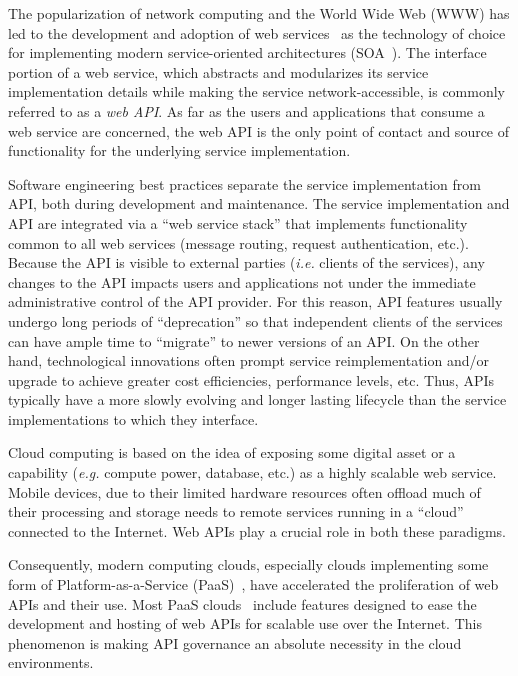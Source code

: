 The popularization of network computing and the World Wide Web (WWW) 
has led to the development and adoption of web services~\cite{6094008} as
the technology of choice for implementing modern service-oriented 
architectures (SOA~\cite{Haines:2010:SAM:1787234.1787269}).
The interface portion of a web service, which abstracts and modularizes
its service implementation
details while making the service network-accessible, is commonly referred to
as a {\em web API}. As far as the users and applications that consume a 
web service
are concerned, the web API is the only point of contact and source of
functionality for the underlying service implementation.

Software engineering best practices separate the service implementation
from API, both during development and maintenance.
The service implementation and API are integrated via 
a ``web service stack'' that implements functionality common to all web
services (message routing, request authentication, etc.).
Because the API is visible to external parties ({\em i.e.} clients of the
services), any changes to the API
impacts users and applications not under the immediate administrative control
of the API provider.  For this reason, API features 
usually undergo long
periods of ``deprecation'' so that independent clients of the services can have
ample time to ``migrate'' to newer versions of an API.  On the other hand,
technological innovations often prompt service reimplementation and/or 
upgrade to
achieve greater cost efficiencies, performance levels, etc.
Thus, APIs typically have a more
slowly evolving and longer lasting lifecycle than the service
implementations to which they interface. 

Cloud computing is based on the idea of exposing some digital asset or a
capability ({\em e.g.} compute power, database, etc.) 
as a highly scalable web service.  Mobile
devices, due to their limited hardware resources often offload much of their
processing and storage needs to remote services running in a ``cloud''
connected to the Internet.  Web APIs
play a crucial role in both these paradigms. 

Consequently, modern computing clouds, especially clouds implementing some form
of Platform-as-a-Service (PaaS)~\cite{4548165}, have accelerated the
proliferation of web APIs and their use.  Most PaaS
clouds~\cite{appscale13,cloudfoundry,openshift} include
features designed to
ease the development and hosting of web APIs for scalable use over the Internet. 
This phenomenon is making API governance an absolute necessity in the cloud
environments.

